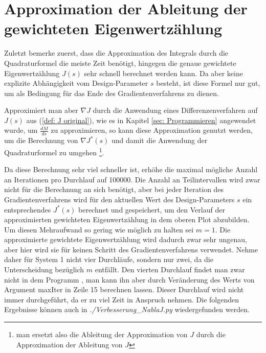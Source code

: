 \documentclass[a4paper,12pt]{report}
\newcommand{\zitat}[1]{\glqq #1\grqq}
\newcommand{\1}{\mathds{1}}
\theoremstyle{plain} %
\theoremstyle{definition} %
\theoremstyle{remark}
\begin{document}
      \section{Approximation der Ableitung der gewichteten Eigenwertzählung}

            Zuletzt bemerke zuerst, dass die Approximation des Integrals durch die Quadraturformel die meiste Zeit benötigt,
            hingegen die genaue gewichtete Eigenwertzählung $J(s)$ sehr schnell berechnet werden kann.
            Da aber keine explizite Abhängigkeit vom Design-Parameter $s$ besteht, ist diese Formel nur gut, um als Bedingung für das Ende des Gradientenverfahrens zu dienen.

            Approximiert man aber $\nabla J$ durch die Anwendung eines Differenzenverfahren auf $J(s)$ aus (\ref{def: J original}),
            wie es in Kapitel \ref{sec: Programmieren} angewendet wurde, um $\frac {dM}{ds}$ zu approximieren,
            so kann diese Approximation genutzt werden, um die Berechnung von $\nabla J^*(s)$ und damit die Anwendung der Quadraturformel zu umgehen
            \footnote{man ersetzt also die Ableitung der Approximation von $J$ durch die Approximation der Ableitung von $J$}.

            Da diese Berechnung sehr viel schneller ist, erhöhe die maximal mögliche Anzahl an Iterationen pro Durchlauf auf 100000.
            Die Anzahl an Teilintervallen wird zwar nicht für die Berechnung an sich benötigt, aber bei jeder Iteration des Gradientenverfahrens wird für den aktuellen Wert des Design-Parameters $s$
            ein entsprechendes $J^*(s)$ berechnet und gespeichert, um den Verlauf der approximierten gewichteten Eigenwertzählung in dem oberen Plot abzubilden.
            Um diesen Mehraufwand so gering wie möglich zu halten sei $m=1$. Die approximierte gewichtete Eigenwertzählung wird dadurch zwar sehr ungenau,
            aber hier wird sie für keinen Schritt des Gradientenverfahrens verwendet.
            Nehme daher für System 1 nicht vier Durchläufe, sondern nur zwei, da die Unterscheidung bezüglich $m$ entfällt.
            Den vierten Durchlauf findet man zwar nicht in dem Programm \mbox{\cite[\textit{./Verbesserung\_NablaJ.py}]{github}}, man kann ihn aber durch Veränderung des Werts von Argument \zitat{maxIter} in Zeile 15 berechnen lassen.
            Dieser Durchlauf wird nicht immer durchgeführt, da er zu viel Zeit in Anspruch nehmen.
            Die folgenden Ergebnisse können auch in \mbox{\textit{./Verbesserung\_NablaJ.py}} wiedergefunden werden.
\end{document}
